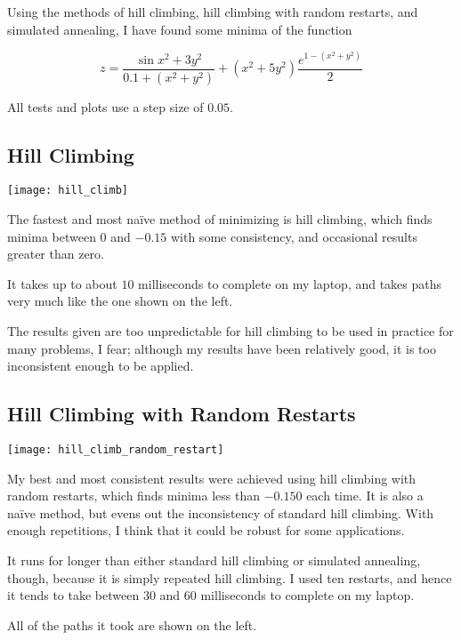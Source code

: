 \documentclass{article}
\begin{document}
Using the methods of hill climbing, hill climbing with random restarts, and
simulated annealing, I have found some minima of the function

\[
    z = \frac{\sin{x^2 + 3y^2}}{0.1 + (x^2 + y^2)}
    + \left(x^2 + 5y^2\right) \frac{e^{1 - \left(x^2 + y^2\right)}}{2}
\]

All tests and plots use a step size of $0.05$.

\subsection*{Hill Climbing}
\begin{multicols*}{2}

\begin{center}
    \texttt{[image: hill\_climb]}
\end{center}

\columnbreak

The fastest and most na{\"i}ve method of minimizing is hill climbing, which
finds minima between $0$ and $-0.15$ with some consistency, and occasional
results greater than zero.

It takes up to about $10$ milliseconds to complete on my laptop, and takes paths very
much like the one shown on the left.

The results given are too unpredictable for hill climbing to be used in practice
for many problems, I fear; although my results have been relatively good, it
is too inconsistent enough to be applied.
\end{multicols*}

\subsection*{Hill Climbing with Random Restarts}
\begin{multicols*}{2}

\begin{center}
    \texttt{[image: hill\_climb\_random\_restart]}
\end{center}

\columnbreak

My best and most consistent results were achieved using hill climbing with
random restarts, which finds minima less than $-0.150$ each time. It is also a
na{\"i}ve method, but evens out the inconsistency of standard hill climbing.
With enough repetitions, I think that it could be robust for some applications.

It runs for longer than either standard hill climbing or simulated annealing,
though, because it is simply repeated hill climbing. I used ten restarts, and
hence it tends to take between $30$ and $60$ milliseconds to complete on my
laptop.

All of the paths it took are shown on the left.

\end{multicols*}
\end{document}
